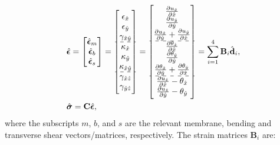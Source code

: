 \documentclass[10pt,letterpaper,journal,final,twoside,twocolumn,nofonttune]{IEEEtran}
\begin{document}
\begin{align}
\label{eq_fem_strain}
&\hat{\bm{\epsilon}}=
\begin{bmatrix}
\hat{\bm{\epsilon}}_m\\
\hat{\bm{\epsilon}}_b\\
\hat{\bm{\epsilon}}_s
\end{bmatrix}
=
\begin{bmatrix}
\epsilon_{\hat{x}}\\ 
\epsilon_{\hat{y}}\\ 
\gamma_{\hat{x}\hat{y}} \\
\hdashline
\kappa_{\hat{x}}\\ 
\kappa_{\hat{y}}\\ 
\kappa_{\hat{x}\hat{y}}\\
\hdashline
\gamma_{\hat{x}\hat{z}}\\ 
\gamma_{\hat{y}\hat{z}}
\end{bmatrix}
= 
\begin{bmatrix}
\frac{\partial u_{\hat{x}}}{\partial \hat{x}}\\
\frac{\partial u_{\hat{y}}}{\partial \hat{y}}\\
\frac{\partial u_{\hat{x}}}{\partial \hat{y}} + \frac{\partial u_{\hat{y}}}{\partial \hat{x}}\\
\hdashline
\frac{\partial \theta_{\hat{x}}}{\partial \hat{x}}\\
\frac{\partial \theta_{\hat{y}}}{\partial \hat{y}}\\
\frac{\partial \theta_{\hat{x}}} {\partial \hat{y}} + \frac{\partial \theta_{\hat{y}}}{ \partial \hat{x}}\\
\hdashline
\frac{\partial u_{\hat{z}}}{\partial \hat{x}}-\theta_{\hat{x}}\\ 
\frac{\partial u_{\hat{z}}}{\partial \hat{y}}-\theta_{\hat{y}}
\end{bmatrix}
=
\sum_{i=1}^{4}
\mathbf{B}_i\hat{\mathbf{d}}_{i}, 
\\
\label{eq_fem_stress}
&\hat{\bm{\sigma}} = 
\mathbf{C}\hat{\bm{\epsilon}},
\end{align}
where the subscripts $m$, $b$, and $s$ are the relevant membrane, bending and transverse shear vectors/matrices, respectively. The strain matrices $\mathbf{B}_i$ are:  
\end{document}
